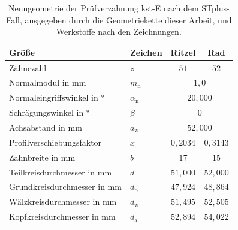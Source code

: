 \begin{table}[htbp]
    \caption{Nenngeometrie der Prüfverzahnung kst-E nach dem STplus-Fall, ausgegeben durch die Geometriekette dieser Arbeit, und Werkstoffe nach den Zeichnungen.}
    \label{tab:geometrie_kste}
    \centering
    \begin{tabular}{llcc}
        Größe                               & Zeichen                              & Ritzel                         & Rad        \\
        \hline
        \arrayrulecolor{black!30}
        Zähnezahl                           & $z$                                  & $51$                           & $52$       \\
        \hline
        Normalmodul in mm                   & $m_{\mathrm{n}}$                     & \multicolumn{2}{c}{$1{,}0$}                 \\
        \hline
        Normaleingriffswinkel in °          & $\alpha_{\mathrm{n}}$                & \multicolumn{2}{c}{$20{,}000$}              \\
        \hline
        Schrägungswinkel in °               & $\beta$                              & \multicolumn{2}{c}{$0$}                     \\
        \hline
        Achsabstand in mm                   & $a_{\mathrm{w}}$                     & \multicolumn{2}{c}{$52{,}000$}              \\
        \hline
        Profilverschiebungsfaktor           & $x$                                  & $0{,}2034$                     & $0{,}3143$ \\
        \hline
        Zahnbreite in mm                    & $b$                                  & $17$                           & $15$       \\
        \hline
        Teilkreisdurchmesser in mm          & $d$                                  & $51{,}000$                     & $52{,}000$ \\
        \hline
        Grundkreisdurchmesser in mm         & $d_{\mathrm{b}}$                     & $47{,}924$                     & $48{,}864$ \\
        \hline
        Wälzkreisdurchmesser in mm          & $d_{\mathrm{w}}$                     & $51{,}495$                     & $52{,}505$ \\
        \hline
        Kopfkreisdurchmesser in mm          & $d_{\mathrm{a}}$                     & $52{,}894$                     & $54{,}022$ \\
        \hline

\end{tabular}
\end{table}
